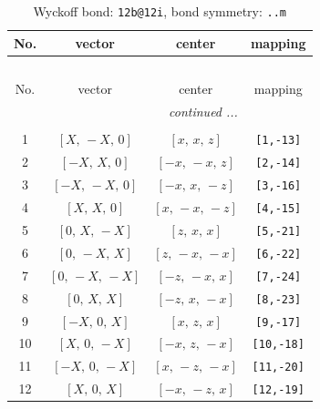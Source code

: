 \documentclass[fleqn,8pt]{jsarticle}
\begin{document}
\renewcommand{\arraystretch}{1.2}
\begin{longtable}{cccc}
\caption{Wyckoff bond: {\tt 12b@12i}, bond symmetry: {\tt ..m}}
 \\
 \hline \hline
No. & vector & center & mapping \\ \hline \endfirsthead

\multicolumn{3}{l}{\tablename\ \thetable{}} \\
 \hline \hline
No. & vector & center & mapping \\ \hline \endhead

 \hline \hline
\multicolumn{3}{r}{\footnotesize\it continued ...} \\ \endfoot

 \hline \hline
\multicolumn{3}{r}{} \\ \endlastfoot

1 & $\left[ X,\, - X,\, 0 \right]$ & $\left[ x,\, x,\, z \right]$ & {\tt [1,-13]} \\ \hline
2 & $\left[ - X,\, X,\, 0 \right]$ & $\left[ - x,\, - x,\, z \right]$ & {\tt [2,-14]} \\ \hline
3 & $\left[ - X,\, - X,\, 0 \right]$ & $\left[ - x,\, x,\, - z \right]$ & {\tt [3,-16]} \\ \hline
4 & $\left[ X,\, X,\, 0 \right]$ & $\left[ x,\, - x,\, - z \right]$ & {\tt [4,-15]} \\ \hline
5 & $\left[ 0,\, X,\, - X \right]$ & $\left[ z,\, x,\, x \right]$ & {\tt [5,-21]} \\ \hline
6 & $\left[ 0,\, - X,\, X \right]$ & $\left[ z,\, - x,\, - x \right]$ & {\tt [6,-22]} \\ \hline
7 & $\left[ 0,\, - X,\, - X \right]$ & $\left[ - z,\, - x,\, x \right]$ & {\tt [7,-24]} \\ \hline
8 & $\left[ 0,\, X,\, X \right]$ & $\left[ - z,\, x,\, - x \right]$ & {\tt [8,-23]} \\ \hline
9 & $\left[ - X,\, 0,\, X \right]$ & $\left[ x,\, z,\, x \right]$ & {\tt [9,-17]} \\ \hline
10 & $\left[ X,\, 0,\, - X \right]$ & $\left[ - x,\, z,\, - x \right]$ & {\tt [10,-18]} \\ \hline
11 & $\left[ - X,\, 0,\, - X \right]$ & $\left[ x,\, - z,\, - x \right]$ & {\tt [11,-20]} \\ \hline
12 & $\left[ X,\, 0,\, X \right]$ & $\left[ - x,\, - z,\, x \right]$ & {\tt [12,-19]} \\
\end{longtable}
\renewcommand{\arraystretch}{1.2}
\end{document}
